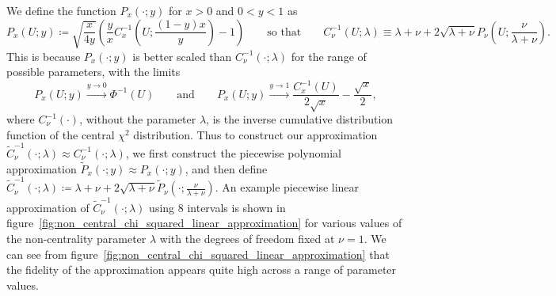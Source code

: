 \documentclass[9pt,a4paper,english]{extarticle}
\begin{document}
We define the function $ P_x(\cdot;y) $ for $ x > 0 $ and $ 0 < y < 1  $ as 
\begin{equation*}
P_x(U;y) \coloneqq \sqrt{\dfrac{x}{4y}} \left( \dfrac{y}{x}  C^{-1}_{x}\left(U; \dfrac{(1 - y)x}{y}\right) - 1\right)
\qquad \text{so that} \qquad 
C^{-1}_{\nu}(U;\lambda) \equiv \lambda + \nu + 2 \sqrt{\lambda + \nu} P_\nu\left(U;\dfrac{\nu}{\lambda + \nu}\right).
\end{equation*}
This is because $ P_x(\cdot;y) $ is better scaled than $ C^{-1}_{\nu}(\cdot;\lambda) $ for the range of possible parameters, with the limits
\begin{equation*}
P_x(U;y) \xrightarrow{y\to 0} \Phi^{-1}(U) 
\qquad \text{and} \qquad 
P_x(U;y) \xrightarrow{y\to 1} \dfrac{C^{-1}_x(U)}{2\sqrt{x}} - \dfrac{\sqrt{x}}{2},
\end{equation*}
where $ C^{-1}_\nu(\cdot) $, without the parameter $ \lambda $, is the inverse cumulative distribution function of the central $ \chi^2 $ distribution. Thus to construct our approximation $ \widetilde{C}^{-1}_{\nu}(\cdot;\lambda) \approx C^{-1}_{\nu}(\cdot;\lambda) $, we first construct the piecewise polynomial approximation $ \widetilde{P}_x(\cdot;y) \approx P_x(\cdot;y) $, and then define 
$ \widetilde{C}^{-1}_{\nu}(\cdot;\lambda) \coloneqq \lambda + \nu + 2 \sqrt{\lambda + \nu} \widetilde{P}_\nu(\cdot;\tfrac{\nu}{\lambda + \nu}) $. An example piecewise linear approximation of $  \widetilde{C}^{-1}_{\nu}(\cdot;\lambda) $ using 8 intervals is shown in figure~\ref{fig:non_central_chi_squared_linear_approximation} for various values of the non-centrality parameter $ \lambda $ with the degrees of freedom fixed at $ \nu = 1 $. We can see from figure~\ref{fig:non_central_chi_squared_linear_approximation} that the fidelity of the approximation appears quite high across a range of parameter values. 
\end{document}
